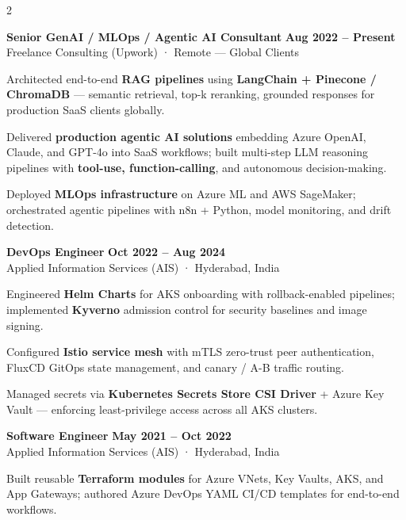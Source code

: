 \documentclass[10pt, a4paper]{article}
\newcommand{\jobentry}[4]{%
  \vspace{1pt}%
  {\fontsize{9.5pt}{9.5pt}\selectfont
   \textbf{\textcolor{mainDark}{#1}} \hfill
   {\fontsize{7.5pt}{7.5pt}\selectfont\textcolor{jobDateCol}{\bfseries#2}}}\\[-1pt]%
  {\fontsize{8pt}{8pt}\selectfont\textcolor{companyCol}{#3}}%
  \vspace{3pt}%
  #4
  \vspace{8pt}%
}
\begin{document}
\begin{paracol}{2}
\begin{minipage}{\linewidth-14pt}
\jobentry%
  {Senior GenAI / MLOps / Agentic AI Consultant}%
  {Aug 2022 – Present}%
  {Freelance Consulting (Upwork) \textcolor{sideMuted}{·} Remote — Global Clients}%
  {%
    \begin{cvbullets}
      \item[\textcolor{bulletCol}{\scriptsize$\blacktriangleright$}]
        Architected end-to-end \textbf{RAG pipelines} using \textbf{LangChain + Pinecone /
        ChromaDB} — semantic retrieval, top-k reranking, grounded responses for production
        SaaS clients globally.
      \item[\textcolor{bulletCol}{\scriptsize$\blacktriangleright$}]
        Delivered \textbf{production agentic AI solutions} embedding Azure OpenAI, Claude, and
        GPT-4o into SaaS workflows; built multi-step LLM reasoning pipelines with
        \textbf{tool-use, function-calling}, and autonomous decision-making.
      \item[\textcolor{bulletCol}{\scriptsize$\blacktriangleright$}]
        Deployed \textbf{MLOps infrastructure} on Azure ML and AWS SageMaker; orchestrated
        agentic pipelines with n8n + Python, model monitoring, and drift detection.
    \end{cvbullets}%
  }

\jobentry%
  {DevOps Engineer}%
  {Oct 2022 – Aug 2024}%
  {Applied Information Services (AIS) \textcolor{sideMuted}{·} Hyderabad, India}%
  {%
    \begin{cvbullets}
      \item[\textcolor{bulletCol}{\scriptsize$\blacktriangleright$}]
        Engineered \textbf{Helm Charts} for AKS onboarding with rollback-enabled pipelines;
        implemented \textbf{Kyverno} admission control for security baselines and image signing.
      \item[\textcolor{bulletCol}{\scriptsize$\blacktriangleright$}]
        Configured \textbf{Istio service mesh} with mTLS zero-trust peer authentication,
        FluxCD GitOps state management, and canary / A-B traffic routing.
      \item[\textcolor{bulletCol}{\scriptsize$\blacktriangleright$}]
        Managed secrets via \textbf{Kubernetes Secrets Store CSI Driver} + Azure Key Vault —
        enforcing least-privilege access across all AKS clusters.
    \end{cvbullets}%
  }

\jobentry%
  {Software Engineer}%
  {May 2021 – Oct 2022}%
  {Applied Information Services (AIS) \textcolor{sideMuted}{·} Hyderabad, India}%
  {%
    \begin{cvbullets}
      \item[\textcolor{bulletCol}{\scriptsize$\blacktriangleright$}]
        Built reusable \textbf{Terraform modules} for Azure VNets, Key Vaults, AKS, and App
        Gateways; authored Azure DevOps YAML CI/CD templates for end-to-end workflows.
    \end{cvbullets}%
  }


\end{minipage}
\end{paracol}
\end{document}
